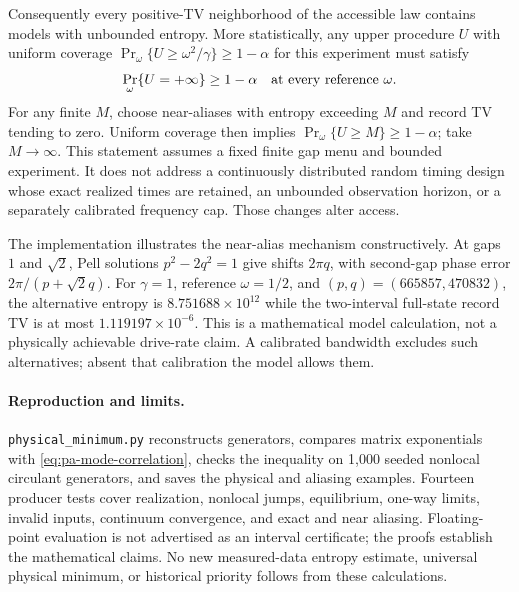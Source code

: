 Consequently every positive-TV neighborhood of the accessible law contains
models with unbounded entropy. More statistically, any upper procedure $U$
with uniform coverage $\Pr_\omega\{U\geq\omega^2/\gamma\}\geq1-\alpha$
for this experiment must satisfy
\begin{equation}
 \Pr_\omega\{U=+\infty\}\geq1-\alpha
 \quad\hbox{at every reference }\omega.
 \label{eq:pa-alias-upper-no-go}
\end{equation}
For any finite $M$, choose near-aliases with entropy exceeding $M$ and
record TV tending to zero. Uniform coverage then implies
$\Pr_\omega\{U\geq M\}\geq1-\alpha$; take $M\to\infty$.
This statement assumes a fixed finite gap menu and bounded experiment.
It does not address a continuously distributed random timing design whose
exact realized times are retained, an unbounded observation horizon, or a
separately calibrated frequency cap. Those changes alter access.

The implementation illustrates the near-alias mechanism constructively.
At gaps $1$ and $\sqrt2$, Pell solutions $p^2-2q^2=1$ give shifts
$2\pi q$, with second-gap phase error
$2\pi/(p+\sqrt2q)$. For $\gamma=1$, reference $\omega=1/2$, and
$(p,q)=(665857,470832)$, the alternative entropy is
$8.751688\times10^{12}$ while the two-interval full-state record TV
is at most $1.119197\times10^{-6}$. This is a mathematical model
calculation, not a physically achievable drive-rate claim. A calibrated
bandwidth excludes such alternatives; absent that calibration the model
allows them.

\paragraph{Reproduction and limits.}
\texttt{physical\_minimum.py} reconstructs generators, compares matrix
exponentials with \eqref{eq:pa-mode-correlation}, checks the inequality on
1,000 seeded nonlocal circulant generators, and saves the physical and
aliasing examples. Fourteen producer tests cover realization, nonlocal
jumps, equilibrium, one-way limits, invalid inputs, continuum convergence,
and exact and near aliasing. Floating-point evaluation is not advertised
as an interval certificate; the proofs establish the mathematical claims.
No new measured-data entropy estimate, universal physical minimum, or
historical priority follows from these calculations.
